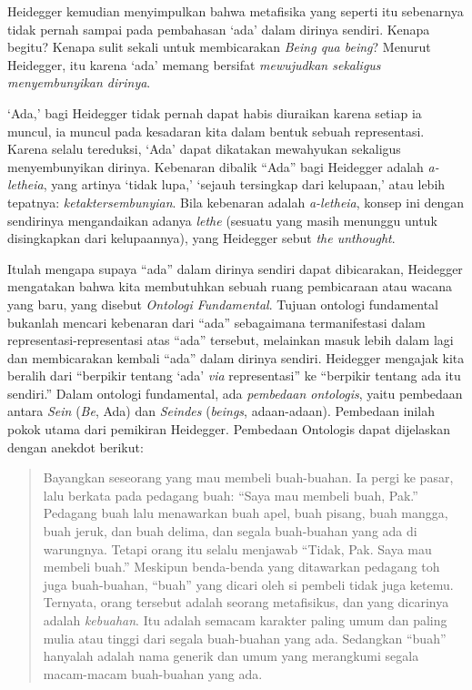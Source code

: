\documentclass[11pt,twoside,a5paper,openany]{memoir}
\begin{document}
Heidegger kemudian menyimpulkan bahwa metafisika yang seperti itu
sebenarnya tidak pernah sampai pada pembahasan `ada' dalam dirinya
sendiri. Kenapa begitu? Kenapa sulit sekali untuk membicarakan
\emph{Being qua being}? Menurut Heidegger, itu karena `ada' memang
bersifat \emph{mewujudkan sekaligus menyembunyikan dirinya}.

`Ada,' bagi Heidegger tidak pernah dapat habis diuraikan karena setiap
ia muncul, ia muncul pada kesadaran kita dalam bentuk sebuah
representasi. Karena selalu tereduksi, `Ada' dapat dikatakan mewahyukan
sekaligus menyembunyikan dirinya. Kebenaran dibalik ``Ada'' bagi
Heidegger adalah \emph{a-letheia}, yang artinya `tidak lupa,' `sejauh
tersingkap dari kelupaan,' atau lebih tepatnya:
\emph{ketaktersembunyian}. Bila kebenaran adalah \emph{a-letheia},
konsep ini dengan sendirinya mengandaikan adanya \emph{lethe} (sesuatu
yang masih menunggu untuk disingkapkan dari kelupaannya), yang Heidegger
sebut \emph{the unthought}.

Itulah mengapa supaya ``ada'' dalam dirinya sendiri dapat dibicarakan,
Heidegger mengatakan bahwa kita membutuhkan sebuah ruang pembicaraan
atau wacana yang baru, yang disebut \emph{Ontologi Fundamental}. Tujuan
ontologi fundamental bukanlah mencari kebenaran dari ``ada'' sebagaimana
termanifestasi dalam representasi-representasi atas ``ada'' tersebut,
melainkan masuk lebih dalam lagi dan membicarakan kembali ``ada'' dalam
dirinya sendiri. Heidegger mengajak kita beralih dari ``berpikir tentang
`ada' \emph{via} representasi'' ke ``berpikir tentang ada itu sendiri.''
Dalam ontologi fundamental, ada \emph{pembedaan ontologis}, yaitu
pembedaan antara \emph{Sein} (\emph{Be}, Ada) dan \emph{Seindes}
(\emph{beings}, adaan-adaan). Pembedaan inilah pokok utama dari
pemikiran Heidegger. Pembedaan Ontologis dapat dijelaskan dengan anekdot
berikut:

\begin{quote}
Bayangkan seseorang yang mau membeli buah-buahan. Ia pergi ke pasar,
lalu berkata pada pedagang buah: ``Saya mau membeli buah, Pak.''
Pedagang buah lalu menawarkan buah apel, buah pisang, buah mangga, buah
jeruk, dan buah delima, dan segala buah-buahan yang ada di warungnya.
Tetapi orang itu selalu menjawab ``Tidak, Pak. Saya mau membeli buah.''
Meskipun benda-benda yang ditawarkan pedagang toh juga buah-buahan,
``buah'' yang dicari oleh si pembeli tidak juga ketemu. Ternyata, orang
tersebut adalah seorang metafisikus, dan yang dicarinya adalah
\emph{kebuahan}. Itu adalah semacam karakter paling umum dan paling
mulia atau tinggi dari segala buah-buahan yang ada. Sedangkan ``buah''
hanyalah adalah nama generik dan umum yang merangkumi segala macam-macam
buah-buahan yang ada.
\end{quote}
\end{document}
